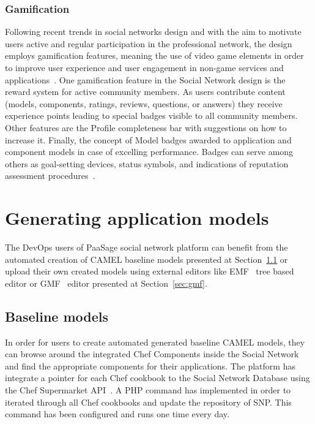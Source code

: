 \subsubsection{Gamification}
Following recent trends in social networks design and with the aim to motivate users active and regular participation in
the professional network, the design employs gamification features, meaning the use of video game elements in order to improve user experience and user engagement in non-game services and applications~\cite{deterding2011gamification}. One gamification feature in the Social Network design is the reward system for active community members. As users contribute content (models, components, ratings, reviews, questions, or answers) they receive experience points leading to special badges visible to all community members. Other features are the Profile completeness bar with suggestions on how to increase it. Finally, the concept of Model badges awarded to application and component models in case of excelling performance. Badges can serve among others as goal-setting devices, status symbols, and indications of reputation assessment procedures~\cite{antin2011badges}.

\section{Generating application models}
The DevOps users of PaaSage social network platform can benefit from the automated creation of CAMEL baseline models presented at Section~\ref{sec:automatedcreation} or upload their own created models using external editors like EMF~\cite{cdomodel} tree based editor or GMF~\cite{gmf_url} editor presented at Section~\ref{sec:gmf}.

\subsection{Baseline models}
\label{sec:automatedcreation}
In order for users to create automated generated baseline CAMEL models, they can browse around the integrated Chef Components inside the Social Network and find the appropriate components for their applications. The platform has integrate a pointer for each Chef cookbook to the Social Network Database using the Chef Supermarket API~\cite{chef_api_url}. A PHP command has implemented in order to iterated through all Chef cookbooks and update the repository of SNP. This command has been configured and runs one time every day.

